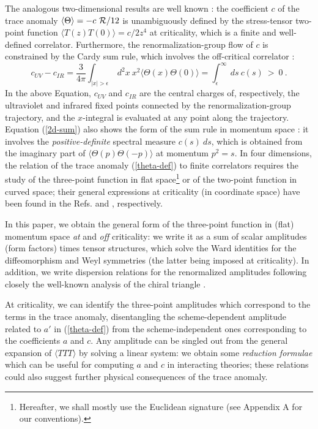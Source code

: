 \documentclass[11pt]{article}
\newcommand{\beq}{\begin{equation}}
\newcommand{\eeq}{\end{equation}}
\def\eps{\epsilon}
\def\TTT{\bra TTT\ket}
\def\bra{\langle}
\def\ket{\rangle}
\begin{document}
The analogous two-dimensional results are
well known \cite{pdf}: the coefficient $c$ of the trace anomaly
\hbox{$\bra \Theta\ket = -c \ {\cal R}/ 12$} 
is unambiguously defined by the stress-tensor two-point function  
$\bra T(z) T(0)\ket= c/2 z^4$ at criticality, which
is a finite and well-defined correlator.
Furthermore, the renormalization-group flow of $c$ is 
constrained by the Cardy sum rule, which involves the off-critical 
correlator \cite{sumrule}:
\beq
c_{UV}-c_{IR}= \frac{3}{4\pi}\int_{|x|>\eps}\ d^2x\ x^2 \bra
\Theta(x)\Theta(0)\ket = \int_\eps^\infty\ d s\ c(s) \ >\ 0\ .
\label{2d-sum}
\eeq
In the above Equation, $c_{UV}$ and $c_{IR}$ are the central charges
of, respectively, the ultraviolet and infrared fixed points
connected by the renormalization-group trajectory,
and the $x$-integral is evaluated at any point along the trajectory.
Equation (\ref{2d-sum}) also shows the form of the sum rule
in momentum space \cite{cfl}: it involves 
the {\it positive-definite} spectral measure $c(s)\ ds$, 
which is obtained from the imaginary part of $\bra\Theta(p) \Theta(-p)\ket$
at momentum $p^2=s$.
In four dimensions, the relation of the trace anomaly (\ref{theta-def}) 
to finite correlators requires the study of  
the three-point function in flat space\footnote{
Hereafter, we shall mostly use the Euclidean signature
(see Appendix A for our conventions).}
or of the two-point function in curved space;
their general expressions at criticality (in coordinate space) 
have been found in the Refs.\cite{eo}\cite{ol} and \cite{os}, respectively. 

In this paper, we obtain the general form of the three-point 
function in (flat) momentum space {\it at} and {\it off} criticality:
we write it as a sum of scalar amplitudes (form factors) times
tensor structures, which solve the Ward identities for the diffeomorphism 
and Weyl symmetries (the latter being imposed at criticality).
In addition, we write dispersion relations for the renormalized amplitudes 
following closely the well-known analysis 
of the chiral triangle \cite{fsby}. 

At criticality, we can identify the three-point amplitudes
which correspond to the terms in the trace anomaly,
disentangling the scheme-dependent amplitude 
related to $a'$ in (\ref{theta-def}) from the scheme-independent ones
corresponding to the coefficients $a$ and $c$. 
Any amplitude can be singled out from the general expansion of 
$\TTT$ by solving a linear system:
we obtain some {\it reduction formulae} which can be useful 
for computing $a$ and $c$ in interacting theories;
these relations could also suggest further physical consequences
of the trace anomaly.
\end{document}
